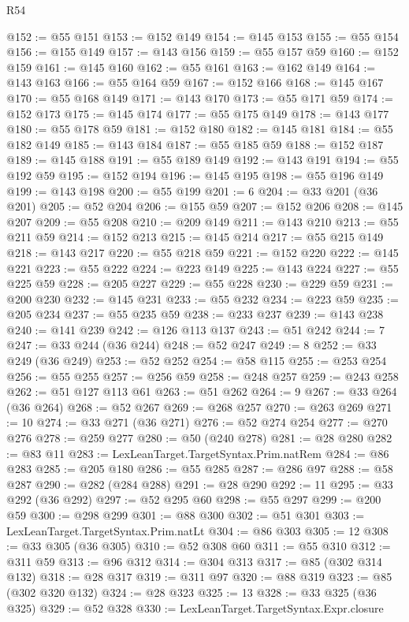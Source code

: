 \begin{lexlean}{R54}
\begin{coremodule}
@152 := @55 @151
@153 := @152 @149
@154 := @145 @153
@155 := @55 @154
@156 := @155 @149
@157 := @143 @156
@159 := @55 @157 @59
@160 := @152 @159
@161 := @145 @160
@162 := @55 @161
@163 := @162 @149
@164 := @143 @163
@166 := @55 @164 @59
@167 := @152 @166
@168 := @145 @167
@170 := @55 @168 @149
@171 := @143 @170
@173 := @55 @171 @59
@174 := @152 @173
@175 := @145 @174
@177 := @55 @175 @149
@178 := @143 @177
@180 := @55 @178 @59
@181 := @152 @180
@182 := @145 @181
@184 := @55 @182 @149
@185 := @143 @184
@187 := @55 @185 @59
@188 := @152 @187
@189 := @145 @188
@191 := @55 @189 @149
@192 := @143 @191
@194 := @55 @192 @59
@195 := @152 @194
@196 := @145 @195
@198 := @55 @196 @149
@199 := @143 @198
@200 := @55 @199
@201 := 6
@204 := @33 @201 (@36 @201)
@205 := @52 @204
@206 := @155 @59
@207 := @152 @206
@208 := @145 @207
@209 := @55 @208
@210 := @209 @149
@211 := @143 @210
@213 := @55 @211 @59
@214 := @152 @213
@215 := @145 @214
@217 := @55 @215 @149
@218 := @143 @217
@220 := @55 @218 @59
@221 := @152 @220
@222 := @145 @221
@223 := @55 @222
@224 := @223 @149
@225 := @143 @224
@227 := @55 @225 @59
@228 := @205 @227
@229 := @55 @228
@230 := @229 @59
@231 := @200 @230
@232 := @145 @231
@233 := @55 @232
@234 := @223 @59
@235 := @205 @234
@237 := @55 @235 @59
@238 := @233 @237
@239 := @143 @238
@240 := @141 @239
@242 := @126 @113 @137
@243 := @51 @242
@244 := 7
@247 := @33 @244 (@36 @244)
@248 := @52 @247
@249 := 8
@252 := @33 @249 (@36 @249)
@253 := @52 @252
@254 := @58 @115
@255 := @253 @254
@256 := @55 @255
@257 := @256 @59
@258 := @248 @257
@259 := @243 @258
@262 := @51 @127 @113 @61
@263 := @51 @262
@264 := 9
@267 := @33 @264 (@36 @264)
@268 := @52 @267
@269 := @268 @257
@270 := @263 @269
@271 := 10
@274 := @33 @271 (@36 @271)
@276 := @52 @274 @254
@277 := @270 @276
@278 := @259 @277
@280 := @50 (@240 @278)
@281 := @28 @280
@282 := @83 @11
@283 := LexLeanTarget.TargetSyntax.Prim.natRem
@284 := @86 @283
@285 := @205 @180
@286 := @55 @285
@287 := @286 @97
@288 := @58 @287
@290 := @282 (@284 @288)
@291 := @28 @290
@292 := 11
@295 := @33 @292 (@36 @292)
@297 := @52 @295 @60
@298 := @55 @297
@299 := @200 @59
@300 := @298 @299
@301 := @88 @300
@302 := @51 @301
@303 := LexLeanTarget.TargetSyntax.Prim.natLt
@304 := @86 @303
@305 := 12
@308 := @33 @305 (@36 @305)
@310 := @52 @308 @60
@311 := @55 @310
@312 := @311 @59
@313 := @96 @312
@314 := @304 @313
@317 := @85 (@302 @314 @132)
@318 := @28 @317
@319 := @311 @97
@320 := @88 @319
@323 := @85 (@302 @320 @132)
@324 := @28 @323
@325 := 13
@328 := @33 @325 (@36 @325)
@329 := @52 @328
@330 := LexLeanTarget.TargetSyntax.Expr.closure

\end{coremodule}
\end{lexlean}
